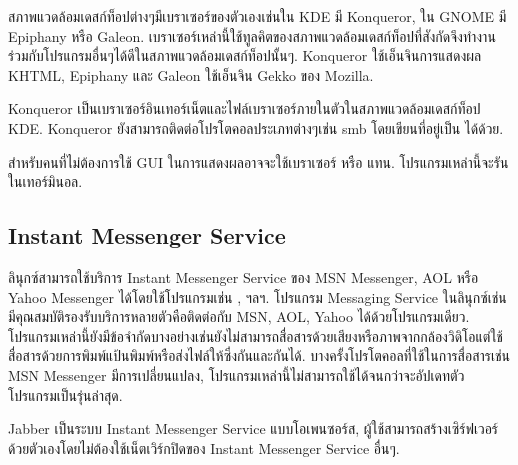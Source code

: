 \begin{thwbr}
\begin{figure}[!hbt]
\end{figure}


สภาพแวดล้อมเดสก์ท็อปต่างๆมีเบราเซอร์ของตัวเองเช่นใน KDE มี Konqueror, ใน GNOME มี Epiphany หรือ Galeon. เบราเซอร์เหล่านี้ใช้ทูลคิตของสภาพแวดล้อมเดสก์ท็อปที่สังกัดจึงทำงานร่วมกับโปรแกรมอื่นๆได้ดีในสภาพแวดล้อมเดสก์ท็อปนั้นๆ. Konqueror ใช้เอ็นจินการแสดงผล KHTML, Epiphany และ Galeon ใช้เอ็นจิน Gekko ของ Mozilla. 

Konqueror เป็นเบราเซอร์อินเทอร์เน็ตและไฟล์เบราเซอร์ภายในตัวในสภาพแวดล้อมเดสก์ท็อป KDE. Konqueror ยังสามารถติดต่อโปรโตคอลประเภทต่างๆเช่น smb โดยเขียนที่อยู่เป็น  ได้ด้วย.

สำหรับคนที่ไม่ต้องการใช้ GUI ในการแสดงผลอาจจะใช้เบราเซอร์  หรือ  แทน. โปรแกรมเหล่านี้จะรันในเทอร์มินอล.

\subsection{Instant Messenger Service}
ลินุกซ์สามารถใช้บริการ Instant Messenger Service ของ MSN Messenger, AOL หรือ Yahoo Messenger ได้โดยใช้โปรแกรมเช่น ,  ฯลฯ. โปรแกรม Messaging Service ในลินุกซ์เช่น  มีคุณสมบัติรองรับบริการหลายตัวคือติดต่อกับ MSN, AOL, Yahoo ได้ด้วยโปรแกรมเดียว. โปรแกรมเหล่านี้ยังมีข้อจำกัดบางอย่างเช่นยังไม่สามารถสื่อสารด้วยเสียงหรือภาพจากกล้องวิดิโอแต่ใช้สื่อสารด้วยการพิมพ์แป้นพิมพ์หรือส่งไฟล์ให้ซึ่งกันและกันได้. บางครั้งโปรโตคอลที่ใช้ในการสื่อสารเช่น MSN Messenger มีการเปลี่ยนแปลง, โปรแกรมเหล่านี้ไม่สามารถใช้ได้จนกว่าจะอัปเดทตัวโปรแกรมเป็นรุ่นล่าสุด.

\begin{figure}[!hbt]
\end{figure}


Jabber เป็นระบบ Instant Messenger Service แบบโอเพนซอร์ส, ผู้ใช้สามารถสร้างเซิร์ฟเวอร์ด้วยตัวเองโดยไม่ต้องใช้เน็ตเวิร์กปิดของ Instant Messenger Service อื่นๆ.




\end{thwbr}
